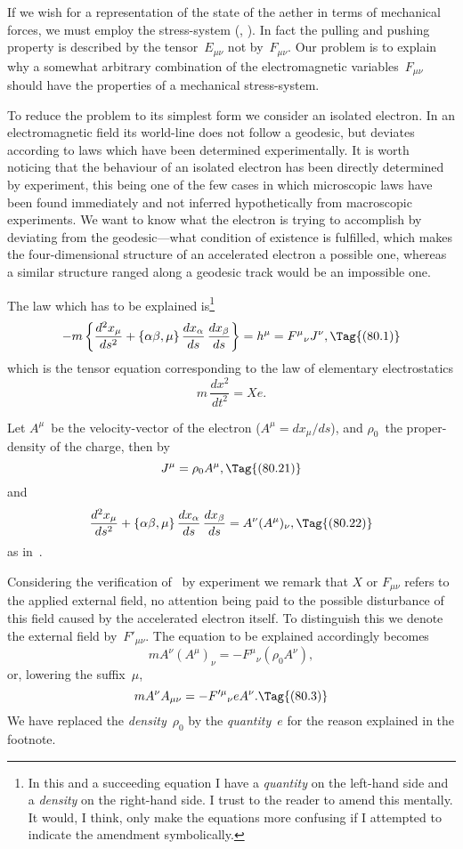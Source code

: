\documentclass[12pt]{book}
\begin{document}
If we wish for a representation of the state of the aether in terms of
mechanical forces, we must employ the stress\hyp{}system (, ). In fact
the pulling and pushing property is described by the tensor~$E_{\mu\nu}$ not by~$F_{\mu\nu}$.
Our problem is to explain why a somewhat arbitrary combination of the
electromagnetic variables~$F_{\mu\nu}$ should have the properties of a mechanical
stress\hyp{}system.

To reduce the problem to its simplest form we consider an isolated electron.
%
%
In an electromagnetic field its world-line does not follow a geodesic, but
deviates according to laws which have been determined experimentally. It is
worth noticing that the behaviour of an isolated electron has been directly
determined by experiment, this being one of the few cases in which microscopic
laws have been found immediately and not inferred hypothetically from
macroscopic experiments. We want to know what the electron is trying to
accomplish by deviating from the geodesic---what condition of existence is
fulfilled, which makes the four\hyp{}dimensional structure of an accelerated electron
a possible one, whereas a similar structure ranged along a geodesic track would
be an impossible one.

The law which has to be explained is\footnote
  {In this and a succeeding equation I have a \emph{quantity} on the left-hand side and a \emph{density} on
  the right-hand side. I trust to the reader to amend this mentally. It would, I think, only make
  the equations more confusing if I attempted to indicate the amendment symbolically.}
\[
-m \left\{\frac{d^{2}x_{\mu}}{ds^{2}}
+ \{\alpha\beta, \mu\}\, \frac{dx_{\alpha}}{ds}\, \frac{dx_{\beta}}{ds}\right\}
= h^{\mu} = {F^{\mu}}_{\nu} J^{\nu},
\Tag{(80.1)}
\]
which is the tensor equation corresponding to the law of elementary electrostatics
\[
m\, \frac{dx^{2}}{dt^{2}} = Xe.
\]

Let $A^{\mu}$~be the velocity\hyp{}vector of the electron ($A^{\mu} = dx_{\mu}/ds$), and $\rho_{0}$~the
proper\hyp{}density of the charge, then by~
\[
J^{\mu} = \rho_{0} A^{\mu},
\Tag{(80.21)}
\]
and
\[
\frac{d^{2}x_{\mu}}{ds^{2}}
+ \{\alpha\beta, \mu\}\, \frac{dx_{\alpha}}{ds}\, \frac{dx_{\beta}}{ds}
= A^{\nu} (A^{\mu})_{\nu},
\Tag{(80.22)}
\]
as in~.

Considering the verification of~ by experiment we remark that $X$ or
$F_{\mu\nu}$ refers to the applied external field, no attention being paid to the possible
disturbance of this field caused by the accelerated electron itself. To distinguish
this we denote the external field by~${F'}_{\mu\nu}$. The equation to be explained
accordingly becomes
\[
mA^{\nu}(A^{\mu})_{\nu} = -{F^{\mu}}_{\nu} (\rho_{0} A^{\nu}),
\]
or, lowering the suffix~$\mu$,
\[
mA^{\nu} A_{\mu\nu} = -{F'^{\mu}}_{\nu} eA^{\nu}.
\Tag{(80.3)}
\]
We have replaced the \emph{density}~$\rho_{0}$ by the \emph{quantity}~$e$ for the reason explained in
the footnote.
\end{document}
